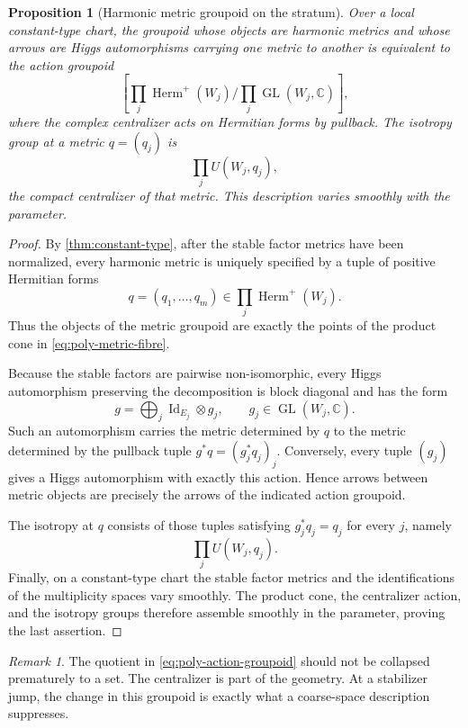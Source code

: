 \documentclass[11pt,reqno]{amsart}
\newtheorem{proposition}[theorem]{Proposition}
\theoremstyle{definition}
\theoremstyle{remark}
\newtheorem{remark}[theorem]{Remark}
\newcommand{\C}{\mathbb C}
\newcommand{\Herm}{\operatorname{Herm}}
\newcommand{\Id}{\operatorname{Id}}
\begin{document}
\begin{proposition}[Harmonic metric groupoid on the stratum]\label{prop:metric-groupoid-poly}
Over a local constant-type chart, the groupoid whose objects are harmonic metrics and whose arrows are Higgs automorphisms carrying one metric to another is equivalent to the action groupoid
\begin{equation}\label{eq:poly-action-groupoid}
  \left[
  \prod_j\operatorname{Herm}^+(W_j)
  \bigg/
  \prod_j\operatorname{GL}(W_j,\C)
  \right],
\end{equation}
where the complex centralizer acts on Hermitian forms by pullback.  The isotropy group at a metric $q=(q_j)$ is
\[
  \prod_jU(W_j,q_j),
\]
the compact centralizer of that metric.  This description varies smoothly with the parameter.
\end{proposition}

\begin{proof}
By \cref{thm:constant-type}, after the stable factor metrics have been normalized, every harmonic metric is uniquely specified by a tuple of positive Hermitian forms
\[
  q=(q_1,\ldots,q_m)\in\prod_j\Herm^+(W_j).
\]
Thus the objects of the metric groupoid are exactly the points of the product cone in \eqref{eq:poly-metric-fibre}.

Because the stable factors are pairwise non-isomorphic, every Higgs automorphism preserving the decomposition is block diagonal and has the form
\[
  g=\bigoplus_j\Id_{E_j}\otimes g_j,
  \qquad g_j\in\operatorname{GL}(W_j,\C).
\]
Such an automorphism carries the metric determined by $q$ to the metric determined by the pullback tuple $g^*q=(g_j^*q_j)_j$.  Conversely, every tuple $(g_j)$ gives a Higgs automorphism with exactly this action.  Hence arrows between metric objects are precisely the arrows of the indicated action groupoid.

The isotropy at $q$ consists of those tuples satisfying $g_j^*q_j=q_j$ for every $j$, namely
\[
  \prod_jU(W_j,q_j).
\]
Finally, on a constant-type chart the stable factor metrics and the identifications of the multiplicity spaces vary smoothly.  The product cone, the centralizer action, and the isotropy groups therefore assemble smoothly in the parameter, proving the last assertion.
\end{proof}

\begin{remark}
The quotient in \eqref{eq:poly-action-groupoid} should not be collapsed prematurely to a set.  The centralizer is part of the geometry.  At a stabilizer jump, the change in this groupoid is exactly what a coarse-space description suppresses.
\end{remark}
\end{document}
